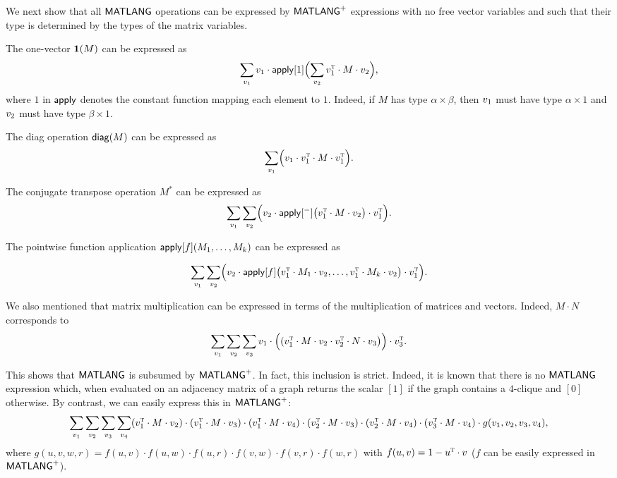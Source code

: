 We next show that all $\mathsf{MATLANG}$ operations can be expressed by $\mathsf{MATLANG}^{\sf +}$ expressions with no
free vector variables and such that their type is determined by the types of the matrix variables.

\begin{example}
The one-vector $\mathbf{1}(M)$ can be expressed as 
$$
\sum_{v_1} v_1\cdot  \mathsf{apply}[1]\Bigl(\sum_{v_2} v_1^{\textsc{t}}\cdot M\cdot v_2\Bigr),
$$
where $1$ in $\mathsf{apply}$ denotes the constant function mapping each element to $1$. Indeed, if $M$ has type
$\alpha\times\beta$, then $v_1$ must have type $\alpha\times 1$ and $v_2$ must  have type $\beta\times 1$. 
\end{example}

\begin{example}
The diag operation $\mathsf{diag}(M)$ can be expressed as 
$$
\sum_{v_1} \Bigl(v_1\cdot v_1^{\textsc{t}}\cdot M \cdot v_1^{\textsc{t}}\Bigr). 
$$
\end{example}


\begin{example}
The conjugate transpose operation $M^*$ can be expressed as 
$$
\sum_{v_1}\sum_{v_2} \Bigl(v_2\cdot\mathsf{apply}[^-]\bigl(v_1^{\textsc{t}}\cdot M\cdot v_2\bigr)\cdot v_1^{\textsc{t}}\Bigr).
$$
\end{example}

\begin{example}
The pointwise function application $\mathsf{apply}[f](M_1,\ldots,M_k)$ can be expressed as 

$$
\sum_{v_1}\sum_{v_2} \Bigl(v_2\cdot\mathsf{apply}[f]\bigl(v_1^{\textsc{t}}\cdot M_1\cdot v_2,\ldots,v_1^{\textsc{t}}\cdot M_k\cdot v_2\bigr)\cdot v_1^{\textsc{t}}\Bigr).
$$
\end{example}


\begin{example}
We also mentioned that matrix multiplication can be expressed in terms of the multiplication of matrices and vectors. Indeed, $M\cdot N$ corresponds to
$$
\sum_{v_1}\sum_{v_2} \sum_{v_3} v_1 \cdot\Bigl( (v_1^{\textsc{t}}\cdot M\cdot v_2\cdot v_2^{\textsc{t}}\cdot N\cdot v_3\bigr)\Bigr)\cdot v_3^{\textsc{t}}.
$$
\end{example}


This shows that $\mathsf{MATLANG}$ is subsumed by $\mathsf{MATLANG}^{\sf +}$. In fact, this inclusion is strict. Indeed, it is known that there is no $\mathsf{MATLANG}$ expression which, when evaluated
on an adjacency matrix of a graph returns the scalar $[1]$ if the graph contains a $4$-clique and $[0]$ otherwise. By contrast, we can easily express this in
$\mathsf{MATLANG}^{\sf +}$:
$$\sum_{v_1}\sum_{v_2}\sum_{v_3}\sum_{v_4} (v_1^{\textsc{t}}\cdot M \cdot v_2)\cdot (v_1^{\textsc{t}}\cdot M\cdot v_3)\cdot (v_1^{\textsc{t}}\cdot M \cdot v_4)\cdot (v_2^{\textsc{t}}\cdot M\cdot v_3)\cdot (v_2^{\textsc{t}}\cdot M\cdot v_4)\cdot (v_3^{\textsc{t}}\cdot M\cdot v_4)\cdot g(v_1,v_2,v_3,v_4),$$
where $g(u,v,w,r)=f(u,v)\cdot f(u,w)\cdot f(u,r)\cdot f(v,w)\cdot f(v,r)\cdot f(w,r)$ with $f(u,v)=1-u^{\textsc{t}}\cdot v$ ($f$ can be easily expressed in $\mathsf{MATLANG}^{\sf +}$).


